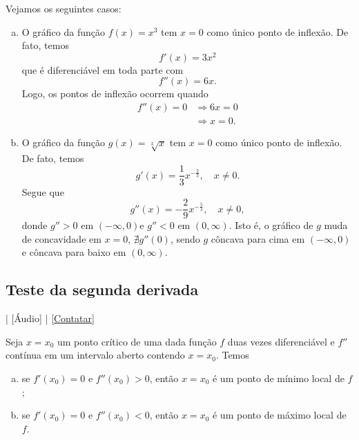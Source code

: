 \begin{ex}
  Vejamos os seguintes casos:
  \begin{enumerate}[a)]
  \item O gráfico da função $f(x) = x^3$ tem $x=0$ como único ponto de inflexão. De fato, temos
    \begin{equation}
      f'(x) = 3x^2
    \end{equation}
    que é diferenciável em toda parte com
    \begin{equation}
      f''(x) = 6x.
    \end{equation}
    Logo, os pontos de inflexão ocorrem quando
    \begin{align}
      f''(x) = 0 &\Rightarrow 6x = 0 \\
                 &\Rightarrow x = 0.
    \end{align}
  \item O gráfico da função $g(x) = \sqrt[3]{x}$ tem $x=0$ como único ponto de inflexão. De fato, temos
    \begin{equation}
      g'(x) = \frac{1}{3}x^{-\frac{2}{3}},\quad x\neq 0.
    \end{equation}
    Segue que
    \begin{equation}
      g''(x) = -\frac{2}{9}x^{-\frac{5}{3}},\quad x\neq 0,
    \end{equation}
    donde $g'' > 0$ em $(-\infty, 0)$e $g'' < 0$ em $(0, \infty)$. Isto é, o gráfico de $g$ muda de concavidade em $x=0$, $\nexists g''(0)$, sendo $g$ côncava para cima em $(-\infty, 0)$ e côncava para baixo em $(0, \infty)$.
\end{enumerate}
\end{ex}

\subsection{Teste da segunda derivada}

\begin{flushright}
  [Vídeo] | [Áudio] | \href{https://phkonzen.github.io/notas/contato.html}{[Contatar]}
\end{flushright}

Seja $x=x_0$ um ponto crítico de uma dada função $f$ duas vezes diferenciável e $f''$ contínua em um intervalo aberto contendo $x=x_0$. Temos
\begin{enumerate}[a)]
\item se $f'(x_0) = 0$ e $f''(x_0) > 0$, então $x=x_0$ é um ponto de mínimo local de $f$;
\item se $f'(x_0) = 0$ e $f''(x_0) < 0$, então $x=x_0$ é um ponto de máximo local de $f$.
\end{enumerate}


